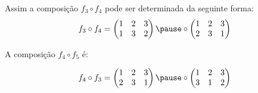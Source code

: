 \documentclass{beamer}
\begin{document}
    \begin{frame}
        Assim a composi\c{c}\~ao $f_3 \circ f_4$ pode ser determinada da seguinte forma:
        \[
            f_3\circ f_4 = \begin{pmatrix}
                    1 & 2 & 3\\
                    1 & 3 & 2
                \end{pmatrix} \pause \circ \begin{pmatrix}
                    1 & 2 & 3\\
                    2 & 3 & 1
                \end{pmatrix}
        \]
    \end{frame}

    \begin{frame}
        A composi\c{c}\~ao $f_4 \circ f_5$ \'e:

        \[
            f_4\circ f_3 = \begin{pmatrix}
                    1 & 2 & 3\\
                    2 & 3 & 1
                \end{pmatrix} \pause \circ \begin{pmatrix}
                    1 & 2 & 3\\
                    3 & 1 & 2
                \end{pmatrix}
        \]
    \end{frame}
\end{document}
